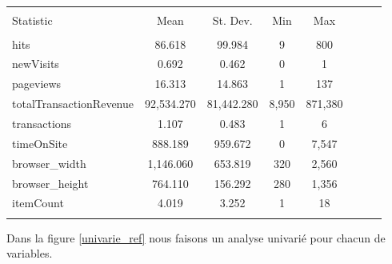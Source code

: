 \begin{table}[!htbp] \centering 
  \caption{} 
  \label{} 
\begin{tabular}{@{\extracolsep{5pt}}lccccccc} 
\\[-1.8ex]\hline 
\hline \\[-1.8ex] 
Statistic & \multicolumn{1}{c}{Mean} & \multicolumn{1}{c}{St. Dev.} & \multicolumn{1}{c}{Min} & \multicolumn{1}{c}{Max} \\ 
\hline \\[-1.8ex] 
hits & 86.618 & 99.984 & 9 & 800 \\ 
newVisits & 0.692 & 0.462 & 0  & 1 \\ 
pageviews & 16.313 & 14.863 & 1  & 137 \\ 
totalTransactionRevenue & 92,534.270 & 81,442.280 & 8,950  & 871,380 \\ 
transactions & 1.107 & 0.483 & 1 & 6 \\ 
timeOnSite & 888.189 & 959.672 & 0  & 7,547 \\ 
browser\_width & 1,146.060 & 653.819 & 320 & 2,560 \\ 
browser\_height & 764.110 & 156.292 & 280  & 1,356 \\ 
itemCount & 4.019 & 3.252 & 1  & 18 \\ 
\hline \\[-1.8ex] 
\end{tabular} 
\end{table} 



Dans la figure  \ref{univarie_ref} nous faisons un analyse univarié pour chacun de variables.

